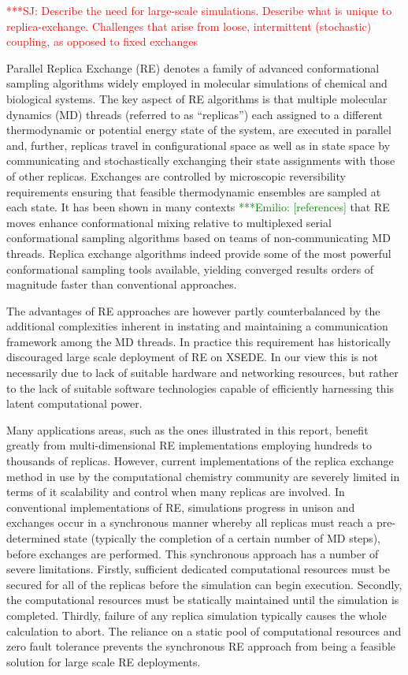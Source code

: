 \documentclass{sig-alternate}
\newcommand{\jhanote}[1]{ {\textcolor{red} { ***SJ: #1 }}}
\newcommand{\egnote}[1]{ {\textcolor{green} { ***Emilio: #1 }}}
\newcommand{\jhanote}[1]{}
\begin{document}
\jhanote{Describe the need for large-scale simulations. Describe what
  is unique to replica-exchange. Challenges that arise from loose,
  intermittent (stochastic) coupling, as opposed to fixed exchanges}

Parallel Replica Exchange (RE) denotes a family of advanced
conformational sampling algorithms widely employed in molecular
simulations of chemical and biological systems. The key aspect of RE
algorithms is that multiple molecular dynamics (MD) threads (referred
to as “replicas”) each assigned to a different thermodynamic or
potential energy state of the system, are executed in parallel and, further,
replicas travel in configurational space as well as in state
space by communicating and stochastically exchanging their state
assignments with those of other replicas. Exchanges are controlled by
microscopic reversibility requirements ensuring that feasible
thermodynamic ensembles are sampled at each state.  It has been shown
in many contexts \egnote{[references]} that RE moves enhance
conformational mixing relative to multiplexed serial conformational
sampling algorithms based on teams of non-communicating
MD threads. Replica exchange algorithms indeed provide some of the
most powerful conformational sampling tools available, yielding
converged results orders of magnitude faster than
conventional approaches.

The advantages of RE approaches are however partly counterbalanced by
the additional complexities inherent in instating and maintaining a
communication framework among the MD threads. In practice this
requirement has historically discouraged large scale deployment of RE
on XSEDE. In our view this is not necessarily due to lack of suitable
hardware and networking resources, but rather to the lack of suitable
software technologies capable of efficiently harnessing this latent
computational power.

Many applications areas, such as the ones illustrated in this report,
benefit greatly from multi-dimensional RE implementations employing
hundreds to thousands of replicas. However, current implementations
of the replica exchange method in use by the computational chemistry
community are severely limited in terms of it scalability and control
when many replicas are involved. In conventional implementations of
RE, simulations progress in unison and exchanges occur in a
synchronous manner whereby all replicas must reach a pre-determined
state (typically the completion of a certain number of MD steps),
before exchanges are performed. This synchronous approach has a number
of severe limitations. Firstly, sufficient dedicated computational
resources must be secured for all of the replicas before the
simulation can begin execution. Secondly, the computational resources
must be statically maintained until the simulation is
completed. Thirdly, failure of any replica simulation typically causes
the whole calculation to abort. The reliance on a static pool of
computational resources and zero fault tolerance prevents the
synchronous RE approach from being a feasible solution for large scale
RE deployments.
\end{document}

